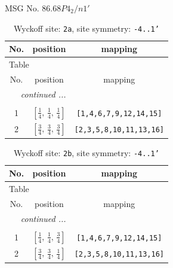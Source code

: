 \documentclass[fleqn,8pt]{jsarticle}
\begin{document}
\setcounter{MaxMatrixCols}{32}

\renewcommand{\tablename}{Table~}
\renewcommand{\figurename}{Figure~}
\begin{center}
\LARGE
MSG No. 86.68\quad$P4_{2}/n1'$
\end{center}
\renewcommand{\arraystretch}{1.2}
\begin{longtable}{ccc}
\caption{Wyckoff site: {\tt 2a}, site symmetry: {\tt -4..1'}}
 \\
 \hline \hline
No. & position & mapping \\ \hline \endfirsthead

\multicolumn{2}{l}{\tablename\ \thetable{}} \\
 \hline \hline
No. & position & mapping \\ \hline \endhead

 \hline \hline
\multicolumn{2}{r}{\footnotesize\it continued ...} \\ \endfoot

 \hline \hline
\multicolumn{2}{r}{} \\ \endlastfoot

1 & $\left[ \frac{1}{4},\, \frac{1}{4},\, \frac{1}{4} \right]$ & {\tt [1,4,6,7,9,12,14,15]} \\ \hline
2 & $\left[ \frac{3}{4},\, \frac{3}{4},\, \frac{3}{4} \right]$ & {\tt [2,3,5,8,10,11,13,16]} \\
\end{longtable}
\renewcommand{\arraystretch}{1.2}
\begin{longtable}{ccc}
\caption{Wyckoff site: {\tt 2b}, site symmetry: {\tt -4..1'}}
 \\
 \hline \hline
No. & position & mapping \\ \hline \endfirsthead

\multicolumn{2}{l}{\tablename\ \thetable{}} \\
 \hline \hline
No. & position & mapping \\ \hline \endhead

 \hline \hline
\multicolumn{2}{r}{\footnotesize\it continued ...} \\ \endfoot

 \hline \hline
\multicolumn{2}{r}{} \\ \endlastfoot

1 & $\left[ \frac{1}{4},\, \frac{1}{4},\, \frac{3}{4} \right]$ & {\tt [1,4,6,7,9,12,14,15]} \\ \hline
2 & $\left[ \frac{3}{4},\, \frac{3}{4},\, \frac{1}{4} \right]$ & {\tt [2,3,5,8,10,11,13,16]} \\
\end{longtable}
\end{document}

